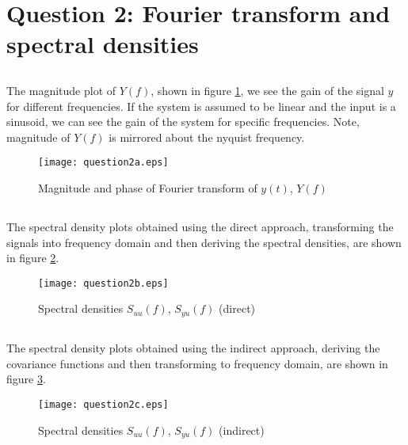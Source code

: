 \documentclass[times,12pt,reqno]{amsart}
\begin{document}
\newpage
\section{Question 2: Fourier transform and spectral densities}

\subsection{}
The magnitude plot of $Y(f)$, shown in figure \ref{fig:q2a}, we see the gain of the
signal $y$ for different frequencies. If the system is assumed to be linear and
the input is a sinusoid, we can see the gain of the system for specific
frequencies. Note, magnitude of $Y(f)$ is mirrored about the nyquist frequency.
\begin{figure}[H]
    \begin{center}
        \texttt{[image: question2a.eps]}
    \end{center}
    \caption{Magnitude and phase of Fourier transform of $y(t)$, $Y(f)$}
    \label{fig:q2a}
\end{figure}

\subsection{}

The spectral density plots obtained using the direct approach, transforming the
signals into frequency domain and then deriving the spectral densities, are
shown in figure \ref{fig:q2b}.
\begin{figure}[H]
    \begin{center}
        \texttt{[image: question2b.eps]}
    \end{center}
    \caption{Spectral densities $S_{uu}(f)$, $S_{yu}(f)$ (direct)}
    \label{fig:q2b}
\end{figure}

\subsection{}

The spectral density plots obtained using the indirect approach, deriving the
covariance functions and then transforming to frequency domain, are shown in
figure \ref{fig:q2c}.
\begin{figure}[H]
    \begin{center}
        \texttt{[image: question2c.eps]}
    \end{center}
    \caption{Spectral densities $S_{uu}(f)$, $S_{yu}(f)$ (indirect)}
    \label{fig:q2c}
\end{figure}
\end{document}
